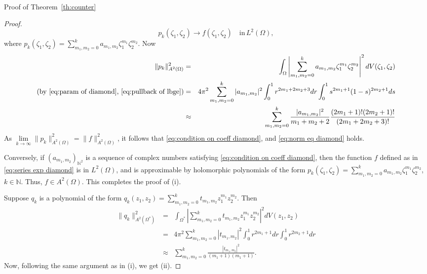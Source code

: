 \documentclass[11pt, oneside, reqno]{amsart}
\numberwithin{equation}{section}
\theoremstyle{definition}
\newcommand{\bea} {\begin{eqnarray}}
\newcommand{\eea} {\end{eqnarray}}
\newcommand{\N}{\mathbb N}
\newcommand{\Om}{\Omega}
\begin{document}
{\begin{section}{Proof of Theorem~\ref{th:counter}}
\begin{proof}
       \[
       p_k(\zeta_1,\zeta_2)\rightarrow f(\zeta_1,\zeta_2)\quad \text{in}\, L^2(\Om),
       \]
       where $p_k(\zeta_1,\zeta_2)=\sum\limits_{m_1,m_2=0}^k a_{m_1,m_2} \zeta_1^{m_1}\zeta_2^{m_2}$. Now
       \bea\nonumber
       \|p_k\|_{A^2(\Om)}^2&=&\int_\Om\left|{\sum\limits_{m_1,m_2=0}^k a_{m_1,m_2}} \zeta_1^{m_1}\zeta_2^{m_2}\right|^2 dV(\zeta_1,\zeta_2)\\
       \nonumber
       \text{(by \eqref{eq:param of diamond}, \eqref{eq:pullback of lbge})}&=& 4\pi^2 \sum\limits_{m_1,m_2=0}^k |a_{m_1,m_2}|^2\int_0^1r^{2m_1+2m_2+3}dr\int_0^1 s^{2m_1+1}(1-s)^{2m_2+1} ds\\
       \nonumber&\approx& \sum\limits_{m_1,m_2=0}^k \frac{|a_{m_1,m_2}|^2}{m_1+m_2+2}\frac{(2m_1+1)!(2m_2+1)!}{(2m_1+2m_2+3)!}
       \eea
       As $\lim\limits_{k\rightarrow\infty}\|p_k\|_{A^2(\Om)}^2=\|f\|_{A^2(\Om)}^2$, it follows that \eqref{eq:condition on coeff diamond}, and \eqref{eq:norm eq diamond} holds. 

       Conversely, if $(a_{m_1,m_2})_{\N^2}$ is a sequence of complex numbers satisfying \eqref{eq:condition on coeff diamond}, then the function $f$ defined as in \eqref{eq:series exp diamond} is in $L^2(\Om)$, and is approximable by holomorphic polynomials of the form  $p_k(\zeta_1,\zeta_2)=\sum\limits_{m_1,m_2=0}^ka_{m_1,m_2}\zeta_1^{m_1} \zeta_2^{m_2}$, $k\in\N$. Thus, $f\in A^2(\Om)$. This completes the proof of (i).

       Suppose $q_k$ is a polynomial of the form $q_k(z_1,z_2)=\sum\limits_{m_1,m_2=0}^kt_{m_1,m_2}z_1^{m_1} z_2^{m_2}$. Then 
       \bea\nonumber
       \|q_k\|_{A^2(\Om^*)}^2&=&\int_{\Om^*}\left|{\sum\limits_{m_1,m_2=0}^k t_{m_1,m_2}} z_1^{m_1}z_2^{m_2}\right|^2 dV(z_1,z_2)\\
       \nonumber
       &=& 4\pi^2 \sum\limits_{m_1,m_2=0}^k |t_{m_1,m_2}|^2\int_0^1r^{2m_1+1}dr\int_0^1 r^{2m_2+1} dr\\
      \nonumber &\approx& \sum\limits_{m_1,m_2=0}^k \frac{|t_{m_1,m_2}|^2}{(m_1+1)(m_1+1)}.
       \eea
Now, following the same argument as in (i), we get (ii).


\end{proof}
\end{section}}
\end{document}
